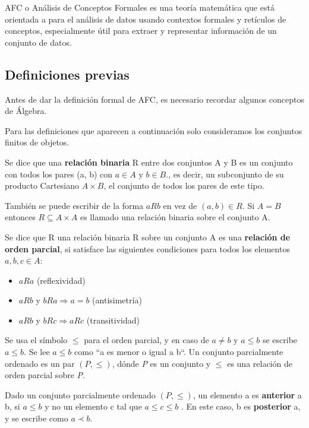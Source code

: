 \documentclass[../../main.tex]{subfiles}
\begin{document}
AFC o Análisis de Conceptos Formales\cite{fca} es una teoría matemática que está orientada a para el análisis de datos usando contextos formales y retículos de conceptos, especialmente útil para extraer y representar información de un conjunto de datos. 


\subsection{Definiciones previas}

Antes de dar la definición formal de AFC, es necesario recordar algunos conceptos de Álgebra.

Para las definiciones que aparecen a continuación solo consideramos los conjuntos finitos de objetos.

\begin{definicion}
Se dice que una \textbf{relación binaria} R entre dos conjuntos A y B es un conjunto con todos los pares (a, b) con $a \in A$ y $b \in B$., es decir, un subconjunto de su producto Cartesiano $A \times B$, el conjunto de todos los pares de este tipo.
\end{definicion}

También se puede escribir de la forma $aRb$ en vez de $(a,b) \in R$. Si $A = B$ entonces $R \subseteq A \times A$ es llamado una relación binaria sobre el conjunto A.


\begin{definicion}
Se dice que R una relación binaria R sobre un conjunto A es una \textbf{relación de orden parcial}, si satisface las siguientes condiciones para todos los elementos $a,b,c \in A$:
\begin{itemize}
    \item $aRa$ (reflexividad)
    \item $aRb$ y $bRa \Longrightarrow a = b$ (antisimetría)
    \item $aRb$ y $bRc \Longrightarrow aRc$ (transitividad)
\end{itemize}
\end{definicion}

Se usa el símbolo $\leq$ para el orden parcial, y en caso de $a \neq b$ y $a \leq b$ se escribe $a \leq b$. Se lee $a \leq b$ como ``a es menor o igual a b``. Un conjunto parcialmente ordenado es un par $(P, \leq)$, dónde \textit{P} es un conjunto y $\leq$ es una relación de orden parcial sobre \textit{P}.


\begin{definicion}
Dado un conjunto parcialmente ordenado $(P,\leq)$, un elemento a es \textbf{anterior} a b, si $a \leq b$ y no un elemento c tal que $a \leq c \leq b$ . En este caso, b es \textbf{posterior} a, y se escribe como $a \prec b$.
\end{definicion}
\end{document}
